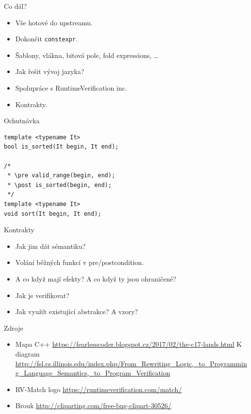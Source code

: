 \documentclass[11pt]{beamer}
\begin{document}
\begin{frame}{Co dál?}
\begin{itemize}
\pause \item Vše hotové do upstreamu.
\pause \item Dokončit \texttt{constexpr}.
\pause \item Šablony, vlákna, bitová pole, fold expressions, \ldots
\pause \item Jak řešit vývoj jazyka?
\pause \item Spolupráce s RuntimeVerification inc.
\pause \item Kontrakty.
\end{itemize}
\end{frame}


\begin{frame}[fragile=singleslide]{Ochutnávka}
\begin{lstlisting}
template <typename It>
bool is_sorted(It begin, It end);

/*
 * \pre valid_range(begin, end);
 * \post is_sorted(begin, end);
 */
template <typename It>
void sort(It begin, It end);
\end{lstlisting}
\end{frame}


\begin{frame}{Kontrakty}
\begin{itemize}
\pause \item Jak jim dát sémantiku?
\pause \item Volání běžných funkcí v pre/postcondition.
\pause \item A co když mají efekty? A co když ty jsou ohraničené?
\pause \item Jak je verifikovat?
\pause \item Jak využít existující abstrakce? A vzory?
\end{itemize}
\end{frame}


\begin{frame}{Zdroje}
\begin{itemize}
\item Mapa C++ \url{https://fearlesscoder.blogspot.cz/2017/02/the-c17-lands.html}
K diagram \url{http://fsl.cs.illinois.edu/index.php/From\_Rewriting\_Logic,\_to\_Programming\_Language\_Semantics,\_to\_Program\_Verification} \\
\item RV-Match logo \url{https://runtimeverification.com/match/}
\item Brouk \url{http://cliparting.com/free-bug-clipart-30526/}
\end{itemize}
\end{frame}
\end{document}
